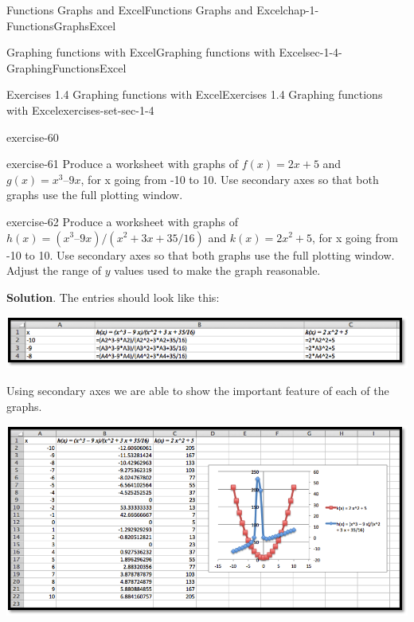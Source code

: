 \documentclass[oneside,10pt,]{book}
\numberwithin{equation}{section}
\begin{document}
\begin{chapterptx}{Functions Graphs and Excel}{}{Functions Graphs and Excel}{}{}{chap-1-FunctionsGraphsExcel}
\begin{sectionptx}{Graphing functions with Excel}{}{Graphing functions with Excel}{}{}{sec-1-4-GraphingFunctionsExcel}
\begin{exercises-subsection-numberless}{Exercises 1.4 Graphing functions with Excel}{}{Exercises 1.4 Graphing functions with Excel}{}{}{exercises-set-sec-1-4}
\begin{divisionexercise}{7}{}{}{exercise-60}
\end{divisionexercise}%
\begin{divisionexercise}{8}{}{}{exercise-61}%
\hypertarget{p-353}{}%
Produce a worksheet with graphs of \(f(x) = 2 x + 5\) and \(g(x) = x^3 – 9 x\), for x going from -10 to 10.  Use secondary axes so that both graphs use the full plotting window.%
\end{divisionexercise}%
\begin{divisionexercise}{9}{}{}{exercise-62}%
\hypertarget{p-354}{}%
Produce a worksheet with graphs of \(h(x) = (x^3 – 9 x)/(x^2 + 3 x + 35/16)\) and \(k(x) = 2 x^2 + 5\), for x going from -10 to 10.  Use secondary axes so that both graphs use the full plotting window.  Adjust the range of \(y\) values used to make the graph reasonable.%
\par\smallskip%
\noindent\textbf{Solution}.\hypertarget{solution-30}{}\quad%
\hypertarget{p-355}{}%
The entries should look like this:%
\begin{sidebyside}{1}{0}{0}{0}%
\begin{sbspanel}{1}%
\includegraphics[width=1\linewidth]{images/sec1-4-sol9a.png}
\end{sbspanel}%
\end{sidebyside}%
\par
\hypertarget{p-356}{}%
Using secondary axes we are able to show the important feature of each of the graphs.%
\begin{sidebyside}{1}{0}{0}{0}%
\begin{sbspanel}{1}%
\includegraphics[width=1\linewidth]{images/sec1-4-sol9b.png}
\end{sbspanel}%
\end{sidebyside}%
\end{divisionexercise}%

\end{exercises-subsection-numberless}
\end{sectionptx}
\end{chapterptx}
\end{document}

